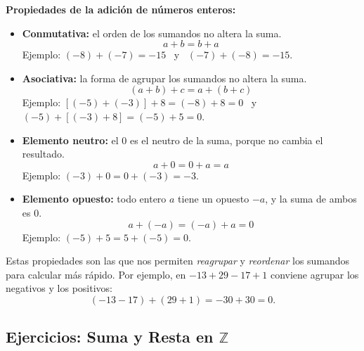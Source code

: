 \documentclass[12pt, letterpaper]{article}
\newcommand{\Z}{\mathbb{Z}}
\begin{document}
\begin{cuadroteoria}
  \textbf{Propiedades de la adición de números enteros:}
  \begin{itemize}
    \item \textbf{Conmutativa:} el orden de los sumandos no altera la suma.
          \[
            a + b = b + a
          \]
          Ejemplo: $(-8) + (-7) = -15$ \ y \ $(-7) + (-8) = -15$.
    \item \textbf{Asociativa:} la forma de agrupar los sumandos no altera la suma.
          \[
            (a + b) + c = a + (b + c)
          \]
          Ejemplo: $[(-5) + (-3)] + 8 = (-8) + 8 = 0$ \ y \ $(-5) + [(-3) + 8] = (-5) + 5 = 0$.
    \item \textbf{Elemento neutro:} el $0$ es el neutro de la suma, porque no cambia el resultado.
          \[
            a + 0 = 0 + a = a
          \]
          Ejemplo: $(-3) + 0 = 0 + (-3) = -3$.
    \item \textbf{Elemento opuesto:} todo entero $a$ tiene un opuesto $-a$, y la suma de ambos es $0$.
          \[
            a + (-a) = (-a) + a = 0
          \]
          Ejemplo: $(-5) + 5 = 5 + (-5) = 0$.
  \end{itemize}
\end{cuadroteoria}

\noindent Estas propiedades son las que nos permiten \emph{reagrupar} y \emph{reordenar} los sumandos para calcular más rápido. Por ejemplo, en $-13 + 29 - 17 + 1$ conviene agrupar los negativos y los positivos:
\[
  (-13 - 17) + (29 + 1) = -30 + 30 = 0.
\]

\subsection{Ejercicios: Suma y Resta en $\Z$}
\end{document}
